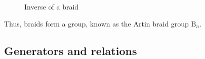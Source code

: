 \documentclass[10pt]{beamer}
\theoremstyle{definition}
\newcommand{\I}{\mathbfbb{I}}
\newcommand{\B}{\mathrm{B}}
\begin{document}
\begin{frame}
\begin{figure}
{\begin{tikzpicture}[scale=1]
				\end{tikzpicture}\label{fig:braidinverse3}}
%
%
			\caption{Inverse of a braid}\label{fig:braidinverse}
		\end{figure}
	\end{frame}

	\begin{frame}
	    Thus, braids form a group, known as the Artin braid group \(\B_n\).
	\end{frame}

	\subsection{Generators and relations}
\end{document}

